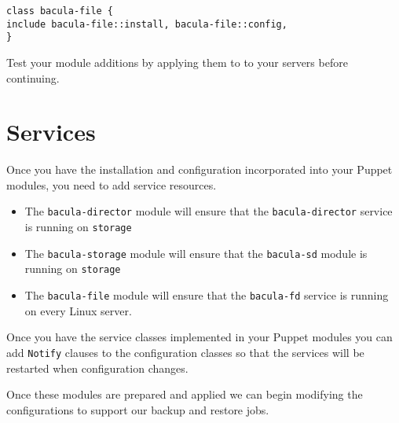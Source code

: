 \documentclass{article}   	%
\begin{document}
\begin{verbatim}
class bacula-file {
include bacula-file::install, bacula-file::config,
}
\end{verbatim}

Test your module additions by applying them to to your servers before continuing.

\section{Services}
Once you have the installation and configuration incorporated into your Puppet modules, you need to add service resources.
\begin{itemize}
	\item The \texttt{bacula-director} module will ensure that the \texttt{bacula-director} service is running on \texttt{storage}
	\item The \texttt{bacula-storage} module will ensure that the \texttt{bacula-sd} module is running on \texttt{storage}
	\item The \texttt{bacula-file} module will ensure that the \texttt{bacula-fd} service is running on every Linux server.
\end{itemize}

Once you have the service classes implemented in your Puppet modules you can add \texttt{Notify} clauses to the configuration classes so that the services will be restarted when configuration changes.

Once these modules are prepared and applied we can begin modifying the configurations to support our backup and restore jobs.
\end{document}
